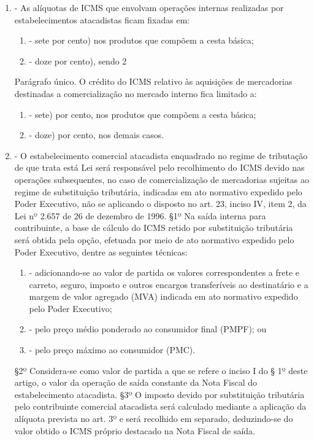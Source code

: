 \documentclass[10pt]{article}
\begin{document}
\begin{enumerate}[label=Art. \arabic*\textdegree]
\item - As alíquotas de ICMS que envolvam operações internas realizadas por estabelecimentos atacadistas ficam fixadas em:
\begin{enumerate}[label=\Roman*]
\item - sete por cento) nos produtos que compõem a cesta básica;
\item - doze por cento), sendo 2%
\end{enumerate}
Parágrafo único. O crédito do ICMS relativo às aquisições de mercadorias destinadas a comercialização no mercado interno fica limitado a:
\begin{enumerate}[label=\Roman*]
\item - sete) por cento, nos produtos que compõem a cesta básica;
\item - doze) por cento, nos demais casos.
\end{enumerate}

\item - O estabelecimento comercial atacadista enquadrado no regime de tributação de que trata está Lei será responsável pelo recolhimento do ICMS devido nas operações subsequentes, no caso de comercialização de mercadorias sujeitas ao regime de substituição tributária, indicadas em ato normativo expedido pelo Poder Executivo, não se aplicando o disposto no art. 23, inciso IV, item 2, da Lei nº 2.657 de 26 de dezembro de 1996.
§1º Na saída interna para contribuinte, a base de cálculo do ICMS retido por substituição tributária será obtida pela opção, efetuada por meio de ato normativo expedido pelo Poder Executivo, dentre as seguintes técnicas:
\begin{enumerate}[label=\Roman*]
\item - adicionando-se ao valor de partida os valores correspondentes a frete e carreto, seguro, imposto e outros encargos transferíveis ao destinatário e a margem de valor agregado (MVA) indicada em ato normativo expedido pelo Poder Executivo;
\item - pelo preço médio ponderado ao consumidor final (PMPF); ou
\item - pelo preço máximo ao consumidor (PMC).
\end{enumerate}
§2º Considera-se como valor de partida a que se refere o inciso I do § 1º deste artigo, o valor da operação de saída constante da Nota Fiscal do estabelecimento atacadista.
§3º O imposto devido por substituição tributária pelo contribuinte comercial atacadista será calculado mediante a aplicação da alíquota prevista no art. 3º e será recolhido em separado, deduzindo-se do valor obtido o ICMS próprio destacado na Nota Fiscal de saída.


\end{enumerate}
\end{document}
